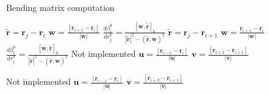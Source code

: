 \begin{algorithm}
    \caption{Bending matrix computation}
    \label{alg:BendingAlgorithm}
    \begin{algorithmic}
                    \STATE $\mathbf{\widetilde{r}} = \mathbf{r}_j - \mathbf{r}_{i}$
                    \STATE $\mathbf{w} = \frac{[\mathbf{r}_{i+1} - \mathbf{r}_{i}]}{|\mathbf{w}|}$
                    \STATE $\frac{d\beta_i^k}{dr^k_j} = \frac{[\mathbf{w},\mathbf{\widetilde{r}}]_k}{|\mathbf{\widetilde{r}}|^2 - (\mathbf{\widetilde{r}},\mathbf{w})^2}$
                    \STATE $\mathbf{\widetilde{r}} = \mathbf{r}_j - \mathbf{r}_{i+1}$
                    \STATE $\mathbf{w} = \frac{\mathbf{r}_{i+1} - \mathbf{r}_{i}}{|\mathbf{w}|}$
                    \STATE $\frac{d\beta_i^k}{dr^k_j} = \frac{[\mathbf{w},\mathbf{\widetilde{r}}]_k}{|\mathbf{\widetilde{r}}|^2 - (\mathbf{\widetilde{r}},\mathbf{w})^2}$
                    \STATE Not implemented
                    \STATE $\mathbf{u} = \frac{[\mathbf{r}_{i-1} - \mathbf{r}_{i}]}{|\mathbf{u}|}$
                    \STATE $\mathbf{v} = \frac{[\mathbf{r}_{i+2} - \mathbf{r}_{i+1}]}{|\mathbf{v}|}$
                    
                    \STATE Not implemented
                    \STATE $\mathbf{u} = \frac{[\mathbf{r}_{i-1} - \mathbf{r}_{i}]}{|\mathbf{u}|}$
                    \STATE $\mathbf{v} = \frac{[\mathbf{r}_{i+2} - \mathbf{r}_{i+1}]}{|\mathbf{v}|}$
                    
                \ENDIF               
            \ENDFOR
        \ENDFOR
    \end{algorithmic}
\end{algorithm}
